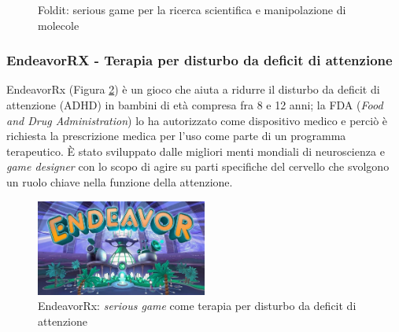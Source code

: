 \begin{figure} [h!]
    \centering
    \caption{Foldit: serious game per la ricerca scientifica e manipolazione di molecole \cite{foldit}}
    \label{fig:foldit} 
\end{figure}

\subsubsection{EndeavorRX - Terapia per disturbo da deficit di attenzione}
EndeavorRx \cite{endeavorRx} (Figura \ref{fig:endeavorRx}) è un gioco che aiuta a ridurre il disturbo da deficit di attenzione (ADHD) in bambini di età compresa fra 8 e 12 anni; la FDA (\textit{Food and Drug Administration}) lo ha autorizzato come dispositivo medico e perciò è richiesta la prescrizione medica per l'uso come parte di un programma terapeutico.
\uppercase{è} stato sviluppato dalle migliori menti mondiali di neuroscienza e \textit{game designer} con lo scopo di agire su parti specifiche del cervello che svolgono un ruolo chiave nella funzione della attenzione.

\begin{figure} [h!]
    \center
    \includegraphics[width=0.5\textwidth]{img/endeavorRx.jpg}
    \caption{EndeavorRx: \textit{serious game} come terapia per disturbo da deficit di attenzione \cite{endeavorRx}}
    \label{fig:endeavorRx}
\end{figure}

